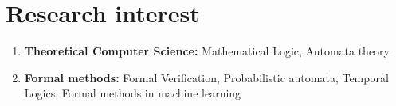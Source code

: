 \documentclass[11pt,a4paper,sans]{moderncv} %
\begin{document}
\makecvtitle %

\newif \ifpersonal
\personalfalse
 
 
\ifpersonal
\section{Personal Information}
Date of birth: March 21, 1983 \hfill Citizenship: Indian
\fi

\section{Research interest}
\begin{enumerate}
 \item \textbf{Theoretical Computer Science:} Mathematical Logic, Automata theory
 \item \textbf{Formal methods:} Formal Verification, Probabilistic automata, Temporal Logics, Formal methods in machine learning
\end{enumerate}
\end{document}
